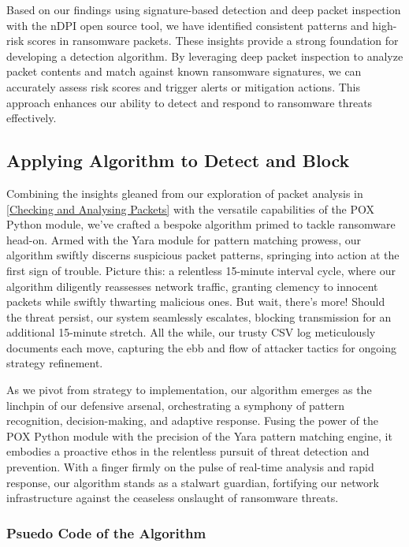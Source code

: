 \documentclass[12pt,letterpaper]{article}
\begin{document}
Based on our findings using signature-based detection and deep packet inspection with the nDPI open source tool, we have identified consistent patterns and high-risk scores in ransomware packets. These insights provide a strong foundation for developing a detection algorithm. By leveraging deep packet inspection to analyze packet contents and match against known ransomware signatures, we can accurately assess risk scores and trigger alerts or mitigation actions. This approach enhances our ability to detect and respond to ransomware threats effectively.


            
        \subsection{Applying Algorithm to Detect and Block}
            \label{Applying Algorithm to Detect and Block}
            
        Combining the insights gleaned from our exploration of packet analysis in \autoref{Checking and Analysing Packets} with the versatile capabilities of the POX Python module, we've crafted a bespoke algorithm primed to tackle ransomware head-on. Armed with the Yara module for pattern matching prowess, our algorithm swiftly discerns suspicious packet patterns, springing into action at the first sign of trouble. Picture this: a relentless 15-minute interval cycle, where our algorithm diligently reassesses network traffic, granting clemency to innocent packets while swiftly thwarting malicious ones. But wait, there's more! Should the threat persist, our system seamlessly escalates, blocking transmission for an additional 15-minute stretch. All the while, our trusty CSV log meticulously documents each move, capturing the ebb and flow of attacker tactics for ongoing strategy refinement.

        As we pivot from strategy to implementation, our algorithm emerges as the linchpin of our defensive arsenal, orchestrating a symphony of pattern recognition, decision-making, and adaptive response. Fusing the power of the POX Python module with the precision of the Yara pattern matching engine, it embodies a proactive ethos in the relentless pursuit of threat detection and prevention. With a finger firmly on the pulse of real-time analysis and rapid response, our algorithm stands as a stalwart guardian, fortifying our network infrastructure against the ceaseless onslaught of ransomware threats.

        \newpage
\subsubsection{Psuedo Code of the Algorithm}
\end{document}
